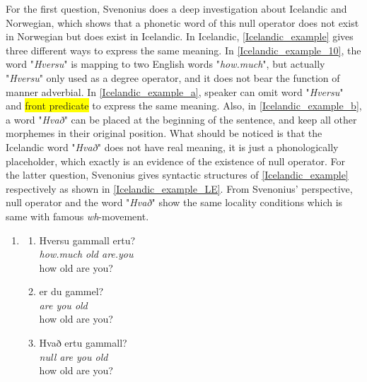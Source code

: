 \documentclass{ctexart}
\begin{document}
For the first question, Svenonius does a deep investigation about Icelandic and Norwegian, which shows that a phonetic word of this null operator does not exist in Norwegian but does exist in Icelandic. In Icelandic, \ref{Icelandic_example} gives three different ways to express the same meaning. In \ref{Icelandic_example_10}, the word "\textit{Hversu}" is mapping to two English words "\textit{how.much}", but actually "\textit{Hversu}" only used as a degree operator, and it does not bear the function of manner adverbial. In \ref{Icelandic_example_a}, speaker can omit word "\textit{Hversu}" and \colorbox{yellow}{front predicate} to express the same meaning. Also, in \ref{Icelandic_example_b}, a word "\textit{Hvað}" can be placed at the beginning of the sentence, and keep all other morphemes in their original position. What should be noticed is that the Icelandic word "\textit{Hvað}" does not have real meaning, it is just a phonologically placeholder, which exactly is an evidence of the existence of null operator. For the latter question, Svenonius gives syntactic structures of \ref{Icelandic_example} respectively as shown in \ref{Icelandic_example_LE}. From Svenonius' perspective, null operator and the word "\textit{Hvað}" show the same locality conditions which is same with famous \textit{wh}-movement. 

\begin{enumerate}[resume]
    \item \label{Icelandic_example}
    
    \begin{enumerate}[ref=(\arabic{enumi}\alph*)]
        \item \label{Icelandic_example_10}
        Hversu gammall ertu? \\
        \textit{how.much old are.you} \\
        how old are you?

        \item \label{Icelandic_example_a}
        er du gammel? \\
        \textit{are you old} \\
        how old are you?

        \item \label{Icelandic_example_b}
        Hvað ertu gammall? \\
        \textit{null are you old} \\
        how old are you?

    \end{enumerate}   
    
\end{enumerate}
\end{document}
